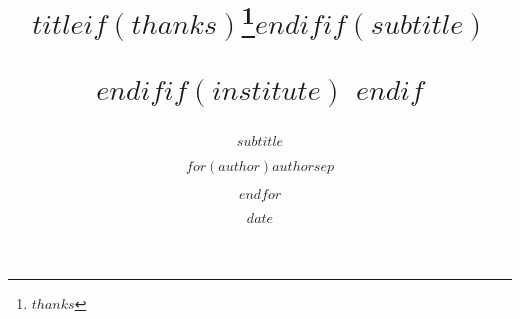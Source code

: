 \documentclass[$if(fontsize)$$fontsize$,$endif$$if(lang)$$babel-lang$,$endif$$if(papersize)$$papersize$paper,$endif$$for(classoption)$$classoption$$sep$,$endfor$]{$documentclass$}
\title{$title$$if(thanks)$\thanks{$thanks$}$endif$$if(subtitle)$%
    \subtitle{$subtitle$}$endif$$if(institute)$\institute{$institute$}%
    $endif$}
\author{$for(author)$$author$$sep$ \and $endfor$}
\institute{$for(institute)$$institute$$sep$ \and $endfor$}
\date{$date$}
\renewenvironment{abstract}{%
    \clearpage\small
    \null\vfil
    \begin{center}%
        {\bfseries \abstractname\vspace{-.5em}\vspace{0pt}}%
    \end{center}%
    \quotation
    }
\begin{document}
  \begin{titlepage}
    \centering
    {\scshape\Large University of hertfordshire \par}
    \vspace{0.25cm}
    {\scshape\large School of Computer Science \par}
    \vspace{1cm}
    {\large\bfseries Modular BSc Honours in Computer Science \par}
    \vspace{1.5cm}
    {\large\itshape 6COM1054 - Artificial Intelligence Project \par}
    \vspace{2cm}
    {\large Final Report\par}
    {\large \today\par}
    \vfill
    {\scshape\Large Persimmon: A visual dataflow language for machine learning pipelines \par}
    \vfill
    { Á. Bermejo \par}
    \vspace{0.25cm}
    { Supervised by Dr.Mariana Lilley \par}
    \vfill
  \end{titlepage}

  $if(abstract)$
    \begin{abstract}
      $abstract$
    \end{abstract}
  $endif$

  $if(keywords)$
    \vfill
    \textbf{Keywords:}$for(keywords)$ $keywords$ $sep$,$endfor$.
  $endif$

  $for(include-before)$
    $include-before$
  $endfor$

  $if(toc)${
    $if(colorlinks)$
      \hypersetup{linkcolor=$if(toccolor)$$toccolor$$else$black$endif$}
    $endif$
    \setcounter{tocdepth}{$toc-depth$}
    \tableofcontents
  }
  $endif$
  $if(lot)$
    \listoftables
  $endif$
  $if(lof)$
    \listoffigures
  $endif$
  $body$

  $if(natbib)$
  $if(bibliography)$
  $if(biblio-title)$
  $if(book-class)$
    \renewcommand\bibname{$biblio-title$}
  $else$
    \renewcommand\refname{$biblio-title$}
  $endif$
  $endif$
  

  $endif$
  $endif$
  $if(biblatex)$
    \printbibliography$if(biblio-title)$[title=$biblio-title$]$endif$
  $endif$
  $if(include-after)$
    \appendix
    $for(include-after)$
      $include-after$
    $endfor$
  $endif$
\end{document}
